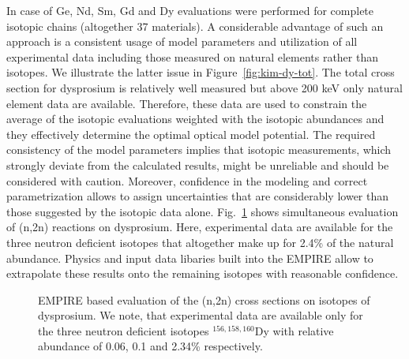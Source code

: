 \documentclass[twocolumn,amsmath,amssymb,10pt,groupedaddress,letter]{revtex4}
\begin{document}
In case of Ge, Nd, Sm, Gd and Dy evaluations were performed for complete isotopic chains (altogether 37 materials). A considerable advantage of such an approach is a consistent usage of model parameters and utilization of all experimental data including those measured on natural elements rather than isotopes. We illustrate the latter issue in Figure~\ref{fig:kim-dy-tot}.  The total cross section for dysprosium is relatively well measured but above 200 keV only natural element data are available. Therefore, these data are used to constrain the average of the isotopic evaluations weighted with the isotopic abundances and they effectively determine the optimal optical model potential. The required consistency of the model parameters implies that isotopic measurements, which strongly deviate from the calculated results, might be unreliable and should be considered with caution. Moreover, confidence in the modeling and correct parametrization allows to assign uncertainties that are considerably lower than those suggested by the isotopic data alone. Fig.~\ref{fig:kim-dy-n2n} shows simultaneous evaluation of (n,2n) reactions on dysprosium. Here, experimental data are available for the three neutron deficient isotopes that altogether make up for 2.4\% of the natural abundance. Physics and input data libaries built into the EMPIRE allow to extrapolate these results onto the remaining isotopes with reasonable confidence.

\begin{figure*}[htbp]
\caption{\label{fig:kim-dy-tot} EMPIRE based evaluation of total cross sections on isotopes of dysprosium. The left panel shows the comparison of data measured on the natural element with the adequate average of the isotopic cross sections plotted in the right panel.}
\end{figure*}

\begin{figure}[htbp]
\caption{\label{fig:kim-dy-n2n} EMPIRE based evaluation of the (n,2n) cross sections on isotopes of dysprosium. We note, that experimental data are available only for the three neutron deficient isotopes  $^{156,158,160}$Dy with relative abundance of 0.06, 0.1 and 2.34\% respectively.}
\end{figure}
\end{document}
